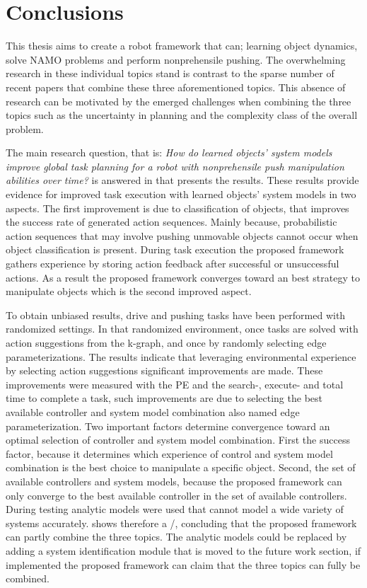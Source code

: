 \chapter{Conclusions}%
\label{chap:conclusion}
This thesis aims to create a robot framework that can; learning object dynamics, solve \ac{NAMO} problems and perform nonprehensile pushing. The overwhelming research in these individual topics stand is contrast to the sparse number of recent papers that combine these three aforementioned topics. This absence of research can be motivated by the emerged challenges when combining the three topics such as the uncertainty in planning and the complexity class of the overall problem.\bs

The main research question, that is: \textit{How do learned objects' system models improve global task planning for a robot with nonprehensile push manipulation abilities over time?} is answered in  that presents the results. These results provide evidence for improved task execution with learned objects' system models in two aspects. The first improvement is due to classification of objects, that improves the success rate of generated action sequences. Mainly because, probabilistic action sequences that may involve pushing unmovable objects cannot occur when object classification is present. During task execution the proposed framework gathers experience by storing action feedback after successful or unsuccessful actions. As a result the proposed framework converges toward an best strategy to manipulate objects which is the second improved aspect.\bs

To obtain unbiased results, drive and pushing tasks have been performed with randomized settings. In that randomized environment, once tasks are solved with action suggestions from the \ac{k-graph}, and once by randomly selecting edge parameterizations. The results indicate that leveraging environmental experience by selecting action suggestions significant improvements are made. These improvements were measured with the \acl{PE} and the search-, execute- and total time to complete a task, such improvements are due to selecting the best available controller and system model combination also named edge parameterization. Two important factors determine convergence toward an optimal selection of controller and system model combination. First the success factor, because it determines which experience of control and system model combination is the best choice to manipulate a specific object. Second, the set of available controllers and system models, because the proposed framework can only converge to the best available controller in the set of available controllers. During testing analytic models were used that cannot model a wide variety of systems accurately.  shows therefore a \xmark/\cmark, concluding that the proposed framework can partly combine the three topics. The analytic models could be replaced by adding a system identification module that is moved to the future work section, if implemented the proposed framework can claim that the three topics can fully be combined.\bs

